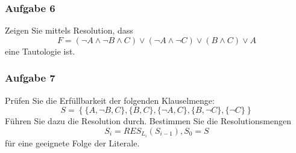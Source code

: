\documentclass[a4paper,14pt,ngerman]{scrartcl}
\begin{document}
\subsubsection{\textbf{Aufgabe 6}}
\label{sec:org2a981cf}

Zeigen Sie mittels Resolution, dass
\[F=(\neg A \land \neg B \land C) \lor (\neg A \land \neg C) \lor (B \land C) \lor A\]
eine Tautologie ist.
\subsubsection{\textbf{Aufgabe 7}}
\label{sec:org424aa0f}

Prüfen Sie die Erfüllbarkeit der folgenden Klauselmenge:
\[S = \left\{\{A, \neg B, C\}, \{B, C\}, \{\neg A, C\}, \{B, \neg C\}, \{\neg C\}\right\}\]
Führen Sie dazu die Resolution durch. Bestimmen Sie die
Resolutionsmengen \[S_i=RES_{L_i}(S_{i-1}), S_0=S\] für eine geeignete
Folge der Literale.
\end{document}
